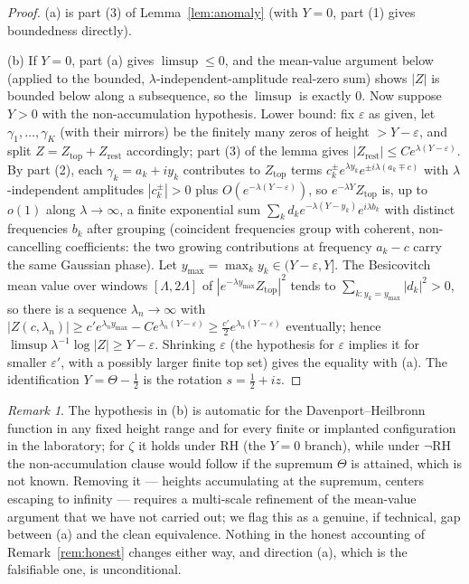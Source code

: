 \documentclass[11pt]{amsart}
\theoremstyle{plain}
\theoremstyle{definition}
\theoremstyle{remark}
\newtheorem{remark}[theorem]{Remark}
\begin{document}
\begin{proof}
(a) is part (3) of Lemma~\ref{lem:anomaly} (with $Y=0$, part (1) gives boundedness directly).

(b) If $Y=0$, part (a) gives $\limsup\le0$, and the mean-value argument below (applied to the
bounded, $\lambda$-independent-amplitude real-zero sum) shows $|Z|$ is bounded below along a
subsequence, so the $\limsup$ is exactly $0$. Now suppose $Y>0$ with the non-accumulation
hypothesis. Lower bound: fix $\varepsilon$ as given, let
$\gamma_1,\dots,\gamma_K$ (with their mirrors) be the finitely many zeros of height
$>Y-\varepsilon$, and split $Z=Z_{\mathrm{top}}+Z_{\mathrm{rest}}$ accordingly; part (3) of the
lemma gives $|Z_{\mathrm{rest}}|\le Ce^{\lambda(Y-\varepsilon)}$. By part (2), each
$\gamma_k=a_k+iy_k$ contributes to $Z_{\mathrm{top}}$ terms
$c_k^\pm e^{\lambda y_k}e^{\pm i\lambda(a_k\mp c)}$ with $\lambda$-independent amplitudes
$|c_k^\pm|>0$ plus $O(e^{-\lambda(Y-\varepsilon)})$, so
$e^{-\lambda Y}Z_{\mathrm{top}}$ is, up to $o(1)$ along $\lambda\to\infty$, a finite
exponential sum $\sum_k d_k e^{-\lambda(Y-y_k)}e^{i\lambda b_k}$ with distinct frequencies
$b_k$ after grouping (coincident frequencies group with coherent, non-cancelling coefficients:
the two growing contributions at frequency $a_k-c$ carry the same Gaussian phase). Let
$y_{\max}=\max_ky_k\in(Y-\varepsilon,Y]$. The Besicovitch mean value over windows
$[\Lambda,2\Lambda]$ of $|e^{-\lambda y_{\max}}Z_{\mathrm{top}}|^2$ tends to
$\sum_{k:y_k=y_{\max}}|d_k|^2>0$, so there is a sequence $\lambda_n\to\infty$ with
$|Z(c,\lambda_n)|\ge c'e^{\lambda_n y_{\max}}-Ce^{\lambda_n(Y-\varepsilon)}
\ge\tfrac{c'}2e^{\lambda_n(Y-\varepsilon)}$ eventually; hence
$\limsup\lambda^{-1}\log|Z|\ge Y-\varepsilon$. Shrinking $\varepsilon$ (the hypothesis for
$\varepsilon$ implies it for smaller $\varepsilon'$, with a possibly larger finite top set)
gives the equality with (a). The identification $Y=\Theta-\tfrac12$ is the
rotation $s=\tfrac12+iz$.
\end{proof}

\begin{remark}\label{rem:accumulation}
The hypothesis in (b) is automatic for the Davenport--Heilbronn function in
any fixed height range and for every finite or implanted configuration in the laboratory; for
$\zeta$ it holds under RH (the $Y=0$ branch), while under $\neg$RH the non-accumulation clause
would follow if the supremum $\Theta$ is attained, which is not
known. Removing it --- heights accumulating at the supremum, centers escaping to infinity ---
requires a multi-scale refinement of the mean-value argument that we have not carried out; we
flag this as a genuine, if technical, gap between (a) and the clean equivalence. Nothing in the
honest accounting of Remark~\ref{rem:honest} changes either way, and direction (a), which is the
falsifiable one, is unconditional.
\end{remark}
\end{document}
